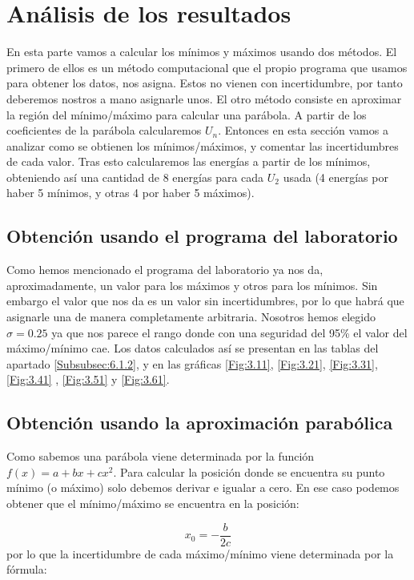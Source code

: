 \documentclass[12pt,a4paper]{article}
\numberwithin{equation}{section}
\numberwithin{figure}{section}
\begin{document}
 
\section{Análisis de los resultados}

En esta parte vamos a calcular los mínimos y máximos usando dos métodos. El primero de ellos es un método computacional que el propio programa que usamos para obtener los datos, nos asigna. Estos no vienen con incertidumbre, por tanto deberemos nostros a mano asignarle unos. El otro método consiste en aproximar la región del mínimo/máximo para calcular una parábola. A partir de los coeficientes de la parábola calcularemos $U_n$. Entonces en esta sección vamos a analizar como se obtienen los mínimos/máximos, y comentar las incertidumbres de cada valor. Tras esto calcularemos las energías a partir de los mínimos, obteniendo así una cantidad de 8 energías para cada $U_2$ usada (4 energías por haber 5 mínimos, y otras 4 por haber 5 máximos). 

\subsection{Obtención usando el programa del laboratorio}

Como hemos mencionado el programa del laboratorio ya nos da, aproximadamente, un valor para los máximos y otros para los mínimos. Sin embargo el valor que nos da es un valor sin incertidumbres, por lo que habrá que asignarle una de manera completamente arbitraria. Nosotros hemos elegido $\sigma = 0.25$ ya que nos parece el rango donde con una seguridad del 95\% el valor del máximo/mínimo cae. Los datos calculados así se presentan en las tablas del apartado \ref{Subsubsec:6.1.2}, y en las gráficas \ref{Fig:3.11}, \ref{Fig:3.21}, \ref{Fig:3.31}, \ref{Fig:3.41} , \ref{Fig:3.51} y \ref{Fig:3.61}.


\subsection{Obtención usando la aproximación parabólica}

Como sabemos una parábola viene determinada por la función $f(x)=a+bx+cx^2$. Para calcular la posición donde se encuentra su punto mínimo (o máximo) solo debemos derivar e igualar a cero. En ese caso podemos obtener que el mínimo/máximo se encuentra en la posición:

\begin{equation}
x_0 = -\frac{b}{2c}
\end{equation}
por lo que la incertidumbre de cada máximo/mínimo viene determinada por la fórmula:
\end{document}
